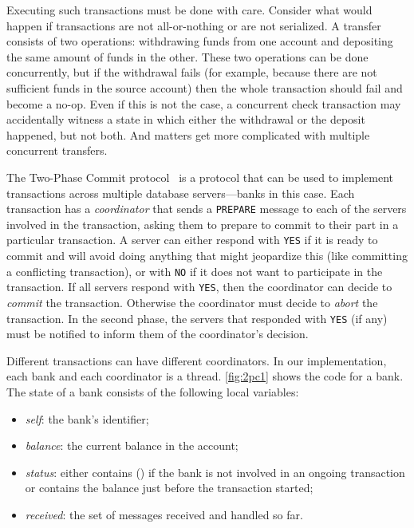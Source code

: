 \documentclass{report}
\begin{document}
Executing such transactions must be done with care.  Consider what
would happen if transactions are not all-or-nothing or are not
serialized.  A transfer consists of two operations: withdrawing
funds from one account and depositing the same amount of funds in
the other.  These two operations can be done concurrently, but if
the withdrawal fails (for example, because there are not sufficient
funds in the source account) then the whole transaction should fail
and become a no-op.  Even if this is not the case, a concurrent
check transaction may accidentally witness a state in which either
the withdrawal or the deposit happened, but not both.  And matters
get more complicated with multiple concurrent transfers.

The Two-Phase Commit protocol~\cite{Gray78} is a protocol that can be
used to implement transactions across multiple database servers---banks
in this case.
Each transaction has a \emph{coordinator} that sends a \texttt{PREPARE}
message to each of the servers involved in the transaction, asking them
to prepare to commit to their part in a particular transaction.
A server can either respond with
\texttt{YES} if it is ready to commit and will avoid doing anything
that might jeopardize this (like committing a conflicting transaction),
or with \texttt{NO} if it does not want to participate in the transaction.
If all servers respond with \texttt{YES}, then the coordinator can
decide to \emph{commit} the transaction.  Otherwise the coordinator
must decide to \emph{abort} the transaction.  In the second phase, the
servers that responded with \texttt{YES} (if any) must be notified
to inform them of the coordinator's decision.

Different transactions can have different coordinators.  In our
implementation, each bank and each coordinator is a thread.
\autoref{fig:2pc1} shows the code for a bank.
The state of a bank consists of the following local variables:
\begin{itemize}
\item \textit{self}: the bank's identifier;
\item \textit{balance}: the current balance in the account;
\item \textit{status}: either contains () if the bank is not involved in an
ongoing transaction or contains the balance
just before the transaction started;
\item \textit{received}: the set of messages received and handled so far.
\end{itemize}
\end{document}
